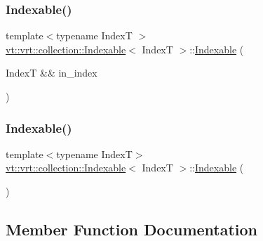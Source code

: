 \subsubsection{\texorpdfstring{Indexable()}{Indexable()}\hspace{0.1cm}{\footnotesize\ttfamily [1/2]}}
{\footnotesize\ttfamily template$<$typename IndexT $>$ \\
\hyperlink{structvt_1_1vrt_1_1collection_1_1_indexable}{vt\+::vrt\+::collection\+::\+Indexable}$<$ IndexT $>$\+::\hyperlink{structvt_1_1vrt_1_1collection_1_1_indexable}{Indexable} (\begin{DoxyParamCaption}\item[{IndexT \&\&}]{in\+\_\+index }\end{DoxyParamCaption})\hspace{0.3cm}{\ttfamily [explicit]}}

\mbox{\label{structvt_1_1vrt_1_1collection_1_1_indexable_a6390131bf531b7128367c51c788305c2}} 
\subsubsection{\texorpdfstring{Indexable()}{Indexable()}\hspace{0.1cm}{\footnotesize\ttfamily [2/2]}}
{\footnotesize\ttfamily template$<$typename IndexT$>$ \\
\hyperlink{structvt_1_1vrt_1_1collection_1_1_indexable}{vt\+::vrt\+::collection\+::\+Indexable}$<$ IndexT $>$\+::\hyperlink{structvt_1_1vrt_1_1collection_1_1_indexable}{Indexable} (\begin{DoxyParamCaption}{ }\end{DoxyParamCaption})\hspace{0.3cm}{\ttfamily [default]}}



\subsection{Member Function Documentation}
\mbox{\label{structvt_1_1vrt_1_1collection_1_1_indexable_a28d05f23e7a20e12e94b8235305c1e82}} 
